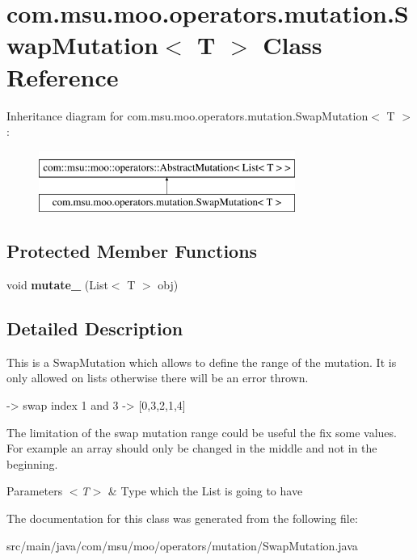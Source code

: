 \hypertarget{classcom_1_1msu_1_1moo_1_1operators_1_1mutation_1_1SwapMutation_3_01T_01_4}{\section{com.\-msu.\-moo.\-operators.\-mutation.\-Swap\-Mutation$<$ T $>$ Class Reference}
\label{classcom_1_1msu_1_1moo_1_1operators_1_1mutation_1_1SwapMutation_3_01T_01_4}
}
Inheritance diagram for com.\-msu.\-moo.\-operators.\-mutation.\-Swap\-Mutation$<$ T $>$\-:\begin{figure}[H]
\begin{center}
\leavevmode
\includegraphics[height=2.000000cm]{classcom_1_1msu_1_1moo_1_1operators_1_1mutation_1_1SwapMutation_3_01T_01_4}
\end{center}
\end{figure}
\subsection*{Protected Member Functions}
\begin{DoxyCompactItemize}
\item 
\hypertarget{classcom_1_1msu_1_1moo_1_1operators_1_1mutation_1_1SwapMutation_3_01T_01_4_ae4b1883a5983fc5c929332762c060316}{void {\bfseries mutate\-\_\-} (List$<$ T $>$ obj)}\label{classcom_1_1msu_1_1moo_1_1operators_1_1mutation_1_1SwapMutation_3_01T_01_4_ae4b1883a5983fc5c929332762c060316}

\end{DoxyCompactItemize}


\subsection{Detailed Description}
This is a Swap\-Mutation which allows to define the range of the mutation. It is only allowed on lists otherwise there will be an error thrown. \begin{DoxyVerb}[0,1,2,3,4] -> swap index 1 and 3 -> [0,3,2,1,4]
\end{DoxyVerb}


The limitation of the swap mutation range could be useful the fix some values. For example an array should only be changed in the middle and not in the beginning.


\begin{DoxyParams}{Parameters}
{\em $<$\-T$>$} & Type which the List is going to have \\
\hline
\end{DoxyParams}


The documentation for this class was generated from the following file\-:\begin{DoxyCompactItemize}
\item 
src/main/java/com/msu/moo/operators/mutation/Swap\-Mutation.\-java\end{DoxyCompactItemize}
